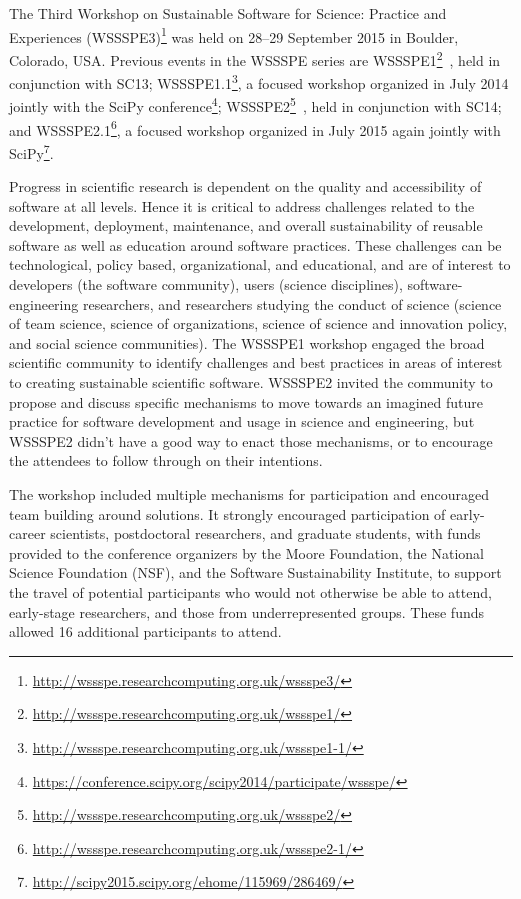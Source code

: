 \documentclass[11pt, oneside]{amsart}
\newcommand{\katznote}[1]{ {\textcolor{magenta}    { ***Dan:      #1 }}}
\newcommand{\gabnote}[1]{ {\textcolor{cyan}    { ***Gabrielle:     #1 }}}
\newcommand{\nchnote}[1]{  {\textcolor{orange}      { ***Neil: #1 }}}
\newcommand{\manishnote}[1]{  {\textcolor{violet}     { ***Manish: #1 }}}
\newcommand{\davidnote}[1]{  {\textcolor{darkgreen}      { ***David: #1 }}}
\begin{document}
%
%
%
%

The Third Workshop on Sustainable Software for Science: Practice and Experiences
(WSSSPE3)\footnote{\url{http://wssspe.researchcomputing.org.uk/wssspe3/}} was
held on 28--29 September 2015 in Boulder, Colorado, USA. Previous events in the
WSSSPE series are
WSSSPE1\footnote{\url{http://wssspe.researchcomputing.org.uk/wssspe1/}}~\cite{WSSSPE1-pre-report,WSSSPE1},
held in conjunction with SC13;
WSSSPE1.1\footnote{\url{http://wssspe.researchcomputing.org.uk/wssspe1-1/}}, a
focused workshop organized in July 2014 jointly with the SciPy
conference\footnote{\url{https://conference.scipy.org/scipy2014/participate/wssspe/}};
WSSSPE2\footnote{\url{http://wssspe.researchcomputing.org.uk/wssspe2/}}~\cite{WSSSPE2-pre-report,WSSSPE2},
held in conjunction with SC14; and
WSSSPE2.1\footnote{\url{http://wssspe.researchcomputing.org.uk/wssspe2-1/}}, a
focused workshop organized in July 2015 again jointly with
SciPy\footnote{\url{http://scipy2015.scipy.org/ehome/115969/286469/}}.

Progress in scientific research is dependent on the quality and accessibility of
software at all levels. Hence it is critical to address challenges related to
the development, deployment, maintenance, and overall sustainability of reusable
software as well as education around software practices. These challenges can be
technological, policy based, organizational, and educational, and are of
interest to developers (the software community), users (science disciplines),
software-engineering researchers, and researchers studying the conduct of
science (science of team science, science of organizations, science of science
and innovation policy, and social science communities). The WSSSPE1 workshop
engaged the broad scientific community to identify challenges and best practices
in areas of interest to creating sustainable scientific software. WSSSPE2
invited the community to propose and discuss specific mechanisms to move towards
an imagined future practice for software development and usage in science and
engineering, but WSSSPE2 didn't have a good way to enact those mechanisms, or to
encourage the attendees to follow through on their intentions.

The workshop included multiple mechanisms for participation and encouraged team
building around solutions. It strongly encouraged participation of early-career
scientists, postdoctoral researchers, and graduate students, with funds provided
to the conference organizers by the Moore Foundation, the National Science
Foundation (NSF), and the Software Sustainability Institute, to support the
travel of potential participants who would not otherwise be able to attend,
early-stage researchers, and those from underrepresented groups. These funds allowed
16 additional participants to attend.
\end{document}
